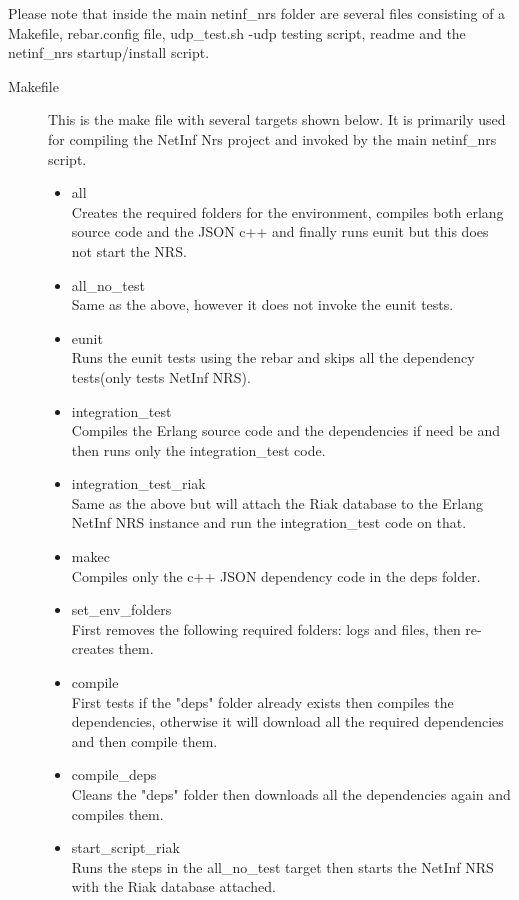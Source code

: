 Please note that inside the main netinf\_nrs folder are several files consisting of a Makefile, rebar.config file, udp\_test.sh -udp testing script, readme and the netinf\_nrs startup/install script. 

\begin{description}
\item[Makefile]
This is the make file with several targets shown below. It is primarily used for compiling the NetInf Nrs project and invoked by the main netinf\_nrs script. 
\begin{itemize}
\item all \\
Creates the required folders for the environment, compiles both erlang source code and the JSON c++ and finally runs eunit but this does not start the NRS.
\item all\_no\_test \\
Same as the above, however it does not invoke the eunit tests.
\item eunit \\
Runs the eunit tests using the rebar and skips all the dependency tests(only tests NetInf NRS).
\item integration\_test \\
Compiles the Erlang source code and the dependencies if need be and then runs only the integration\_test code.
\item integration\_test\_riak \\
Same as the above but will attach the Riak database to the Erlang NetInf NRS instance and run the integration\_test code on that.
\item makec \\
Compiles only the c++ JSON dependency code in the deps folder. 
\item set\_env\_folders \\
First removes the following  required folders: logs and files, then re-creates them.
\item compile \\
First tests if the "deps" folder already exists then compiles the dependencies, otherwise it will download all the required dependencies and then compile them.
\item compile\_deps \\
Cleans the "deps" folder then downloads all the dependencies again and compiles them.
\item start\_script\_riak \\
Runs the steps in the all\_no\_test target then starts the NetInf NRS with the Riak database attached.

\end{itemize}
\end{description}
